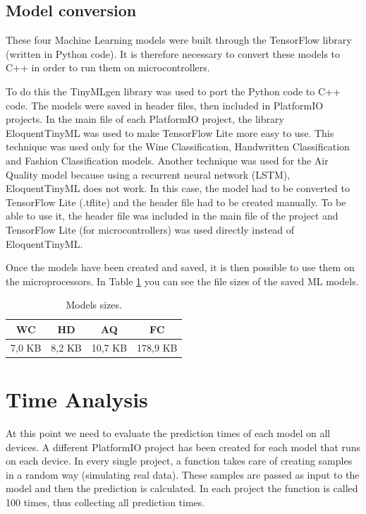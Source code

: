 \documentclass{article}
\begin{document}
\subsection{Model conversion}
These four Machine Learning models were built through the TensorFlow library (written in Python code). It is therefore necessary to convert these models to C++ in order to run them on microcontrollers.

To do this the TinyMLgen library was used to port the Python code to C++ code. The models were saved in header files, then included in PlatformIO projects. In the main file of each PlatformIO project, the library EloquentTinyML was used to make TensorFlow Lite more easy to use. This technique was used only for the Wine Classification, Handwritten Classification and Fashion Classification models. Another technique was used for the Air Quality model because using a recurrent neural network (LSTM), EloquentTinyML does not work. In this case, the model had to be converted to TensorFlow Lite (.tflite) and the header file had to be created manually. To be able to use it, the header file was included in the main file of the project and TensorFlow Lite (for microcontrollers) was used directly instead of EloquentTinyML.

Once the models have been created and saved, it is then possible to use them on the microprocessors. In Table \ref{tab:1} you can see the file sizes of the saved ML models.

\begin{table}[H]
    \caption{Models sizes.}    
    \centering
    \begin{tabular}{ |c|c|c|c| } 
        \hline 
        {\bf WC} & {\bf HD} & {\bf AQ}  & {\bf FC} \\
        \hline 
        7,0 KB & 8,2 KB & 10,7 KB & 178,9 KB \\ 
        \hline
    \end{tabular}
    \label{tab:1}
\end{table}

\pagebreak 

\section{Time Analysis}
At this point we need to evaluate the prediction times of each model on all devices. A different PlatformIO project has been created for each model that runs on each device. In every single project, a function takes care of creating samples in a random way (simulating real data). These samples are passed as input to the model and then the prediction is calculated. In each project the function is called 100 times, thus collecting all prediction times. 
\end{document}
